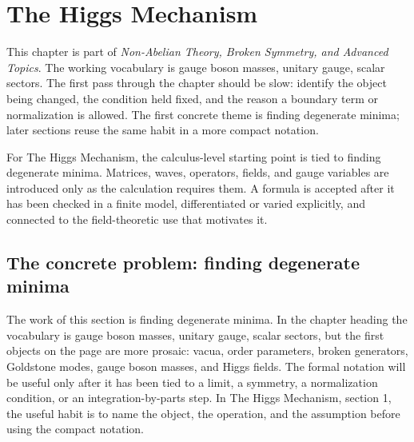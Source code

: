 \chapter{The Higgs Mechanism}


This chapter is part of \emph{Non-Abelian Theory, Broken Symmetry, and Advanced Topics}.  The working vocabulary is gauge boson masses, unitary gauge, scalar sectors.  The first pass through the chapter should be slow: identify the object being changed, the condition held fixed, and the reason a boundary term or normalization is allowed.  The first concrete theme is finding degenerate minima; later sections reuse the same habit in a more compact notation.

For The Higgs Mechanism, the calculus-level starting point is tied to finding degenerate minima.  Matrices, waves, operators, fields, and gauge variables are introduced only as the calculation requires them.  A formula is accepted after it has been checked in a finite model, differentiated or varied explicitly, and connected to the field-theoretic use that motivates it.

\section{The concrete problem: finding degenerate minima}













The work of this section is finding degenerate minima.  In the chapter heading the vocabulary is gauge boson masses, unitary gauge, scalar sectors, but the first objects on the page are more prosaic: vacua, order parameters, broken generators, Goldstone modes, gauge boson masses, and Higgs fields.  The formal notation will be useful only after it has been tied to a limit, a symmetry, a normalization condition, or an integration-by-parts step.  In The Higgs Mechanism, section 1, the useful habit is to name the object, the operation, and the assumption before using the compact notation.

